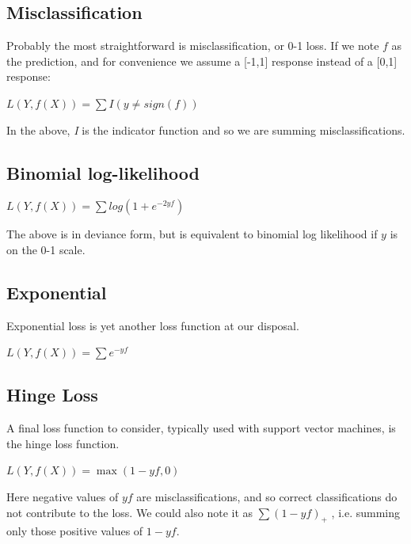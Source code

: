 \documentclass[english,nohyper,titlepage]{tufte-handout}
\begin{document}
\subsection{Misclassification}
Probably the most straightforward is misclassification, or 0-1 loss.  If we note $f$ as the prediction, and for convenience we assume a [-1,1] response instead of a [0,1] response:

\vspace{.25cm}
\noindent$L(Y, f(X)) = \sum I(y\neq sign(f))$
\vspace{.25cm}

In the above, \emph{I} is the indicator function and so we are summing misclassifications.


\subsection{Binomial log-likelihood}

\vspace{.25cm}
\noindent$L(Y, f(X)) = \sum log(1 + e^{-2yf})$
\vspace{.25cm}

The above is in deviance form, but is equivalent to binomial log likelihood if $y$ is on the 0-1 scale.

\subsection{Exponential}
Exponential loss is yet another loss function at our disposal.

\vspace{.25cm}
\noindent$L(Y, f(X)) = \sum e^{-yf}$
\vspace{.25cm}

\subsection{Hinge Loss}
A final loss function to consider, typically used with support vector machines, is the hinge loss function.

\vspace{.25cm}
\noindent$L(Y, f(X)) = \max(1-yf, 0)$
\vspace{.25cm}

Here negative values of $yf$ are misclassifications, and so correct classifications do not contribute to the loss.  We could also note it as $\sum (1-yf)_+$ , i.e. summing only those positive values of $1-yf$.
\end{document}
